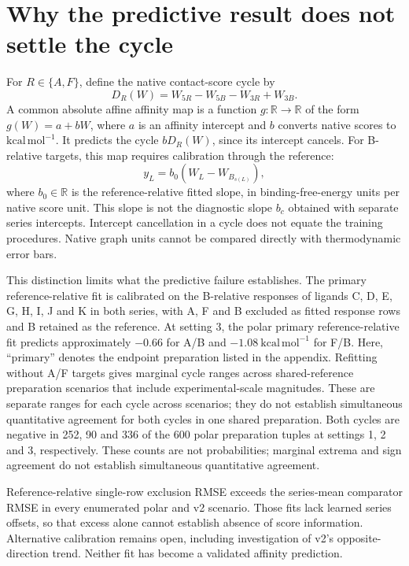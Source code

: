 \documentclass{article}
\begin{document}
\section{Why the predictive result does not settle the cycle}

For \(R\in\{A,F\}\), define the native contact-score cycle by
\[
 D_R(W)=W_{5R}-W_{5B}-W_{3R}+W_{3B}.
\]
A common absolute affine affinity map is a function \(g:\mathbb R\to\mathbb R\) of the form \(g(W)=a+bW\), where \(a\) is an affinity intercept and \(b\) converts native scores to \(\mathrm{kcal\,mol^{-1}}\). It predicts the cycle \(bD_R(W)\), since its intercept cancels. For B-relative targets, this map requires calibration through the reference:
\[
 y_L=b_0(W_L-W_{B_{s(L)}}),
\]
where \(b_0\in\mathbb R\) is the reference-relative fitted slope, in binding-free-energy units per native score unit. This slope is not the diagnostic slope \(b_c\) obtained with separate series intercepts. Intercept cancellation in a cycle does not equate the training procedures. Native graph units cannot be compared directly with thermodynamic error bars.

This distinction limits what the predictive failure establishes. The primary reference-relative fit is calibrated on the B-relative responses of ligands C, D, E, G, H, I, J and K in both series, with A, F and B excluded as fitted response rows and B retained as the reference. At setting 3, the polar primary reference-relative fit predicts approximately \(-0.66\) for A/B and \(-1.08\ \mathrm{kcal\,mol^{-1}}\) for F/B. Here, ``primary'' denotes the endpoint preparation listed in the appendix. Refitting without A/F targets gives marginal cycle ranges across shared-reference preparation scenarios that include experimental-scale magnitudes. These are separate ranges for each cycle across scenarios; they do not establish simultaneous quantitative agreement for both cycles in one shared preparation. Both cycles are negative in 252, 90 and 336 of the 600 polar preparation tuples at settings 1, 2 and 3, respectively. These counts are not probabilities; marginal extrema and sign agreement do not establish simultaneous quantitative agreement.

Reference-relative single-row exclusion RMSE exceeds the series-mean comparator RMSE in every enumerated polar and v2 scenario. Those fits lack learned series offsets, so that excess alone cannot establish absence of score information. Alternative calibration remains open, including investigation of v2's opposite-direction trend. Neither fit has become a validated affinity prediction.
\end{document}
